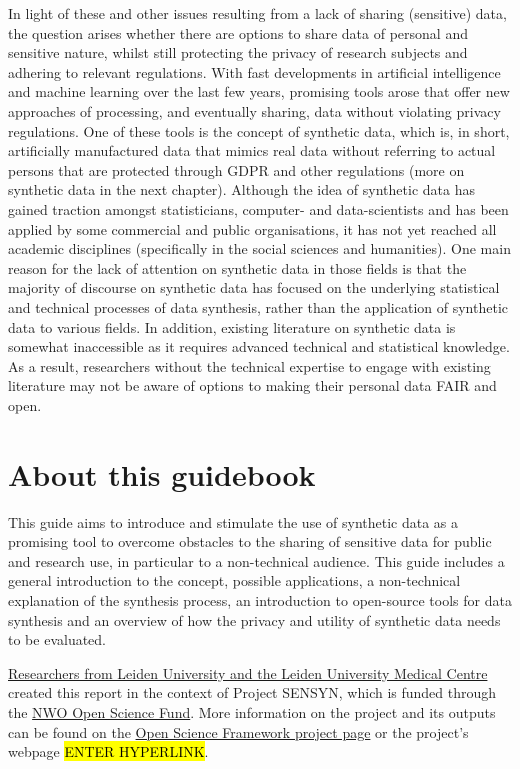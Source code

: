 In light of these and other issues resulting from a lack of sharing (sensitive) data, the question arises whether there are options to share data of personal and sensitive nature, whilst still protecting the privacy of research subjects and adhering to relevant regulations. With fast developments in artificial intelligence and machine learning  over the last few years, promising tools arose that offer new approaches of processing, and eventually sharing, data without violating privacy regulations. One of these tools is the concept of synthetic data, which is, in short, artificially manufactured data that mimics real data without referring to actual persons that are protected through GDPR and other regulations \cite{el2020practical,hradec2022multipurpose,jordon2022synthetic} (more on synthetic data in the next chapter). Although the idea of synthetic data has gained traction amongst statisticians, computer- and data-scientists and has been applied by some commercial and public organisations, it has not yet reached all academic disciplines (specifically in the social sciences and humanities). One main reason for the lack of attention on synthetic data in those fields is that the majority of discourse on synthetic data has focused on the underlying statistical and technical processes of data synthesis, rather than the application of synthetic data to various fields. In addition, existing literature on synthetic data is somewhat inaccessible as it requires advanced technical and statistical knowledge. As a result, researchers without the technical expertise to engage with existing literature may not be aware of options to making their personal data FAIR and open.



\section{About this guidebook}
\label{intro:about}

This guide aims to introduce and stimulate the use of synthetic data as a promising tool to overcome obstacles to the sharing of sensitive data for public and research use, in particular to a non-technical audience. 
This guide includes a general introduction to the concept, possible applications, a non-technical explanation of the synthesis process, an introduction to open-source tools for data synthesis and an overview of how the privacy and utility of synthetic data needs to be evaluated.

\href{https://www.universiteitleiden.nl/en/research/research-projects/governance-and-global-affairs/project-sensyn#tab-1}{Researchers from Leiden University and the Leiden University Medical Centre} created this report in the context of Project SENSYN, which is funded through the \href{https://www.nwo.nl/onderzoeksprogrammas/open-science/open-science-fund}{NWO Open Science Fund}. More information on the project and its outputs can be found on the \href{https://osf.io/4gmjn/resources}{Open Science Framework project page} or the project's webpage \hl{ENTER HYPERLINK}.

